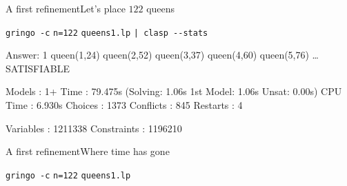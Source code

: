 \begin{frame}[fragile]{A first refinement}{Let's place \alert{$122$} queens}
\begin{block}{\alert<1>{\lstinline{gringo -c} \alert{\lstinline{n=122}} \lstinline{queens1.lp} \lstinline{| clasp --stats}}}
\vspace*{-3mm}
\pause\footnotesize%
\begin{semiverbatim}
Answer: 1
queen(1,24) queen(2,52) queen(3,37) queen(4,60) queen(5,76) \dots{}
SATISFIABLE

Models      : 1+
\alert<2>{Time        : 79.475s} (\alert<2>{Solving: 1.06s} 1st Model: 1.06s Unsat: 0.00s)
CPU Time    : 6.930s
Choices     : 1373
\alert<2>{Conflicts   : 845}
Restarts    : 4

\alert<3>{Variables   : 1211338}
\alert<3>{Constraints : 1196210}
\end{semiverbatim}
\end{block}
\end{frame}
\begin{frame}[fragile]{A first refinement}{Where time has gone}
\begin{block}{\alert{\lstinline{gringo -c} \alert{\lstinline{n=122}} \lstinline{queens1.lp}} }
\vspace*{-3mm}
\footnotesize%
\end{block}
\end{frame}
